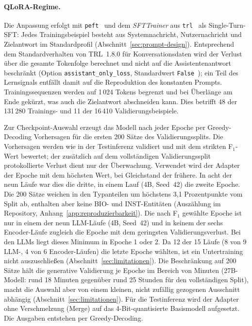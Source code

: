 \paragraph{QLoRA-Regime.}
Die Anpassung erfolgt mit \texttt{peft}~\cite{mangrulkar2022peft} und dem
\emph{SFTTrainer} aus \texttt{trl}~\cite{vonwerra2026trldocs} als
Single-Turn-SFT: Jedes Trainingsbeispiel besteht aus Systemnachricht,
Nutzernachricht und Zielantwort im Standardprofil
(Abschnitt~\ref{sec:prompt-design}).
Entsprechend dem Standardverhalten von TRL~1.8.0 für Konversationsdaten
wird der Verlust über die gesamte Tokenfolge berechnet und nicht auf die
Assistentenantwort beschränkt (Option \texttt{assistant\_only\_loss},
Standardwert \texttt{False}~\cite{vonwerra2026trldocs}); ein Teil des
Lernsignals entfällt damit auf die Reproduktion des konstanten Prompts.
Trainingssequenzen werden auf 1\,024 Tokens begrenzt und bei Überlänge
am Ende gekürzt, was auch die Zielantwort abschneiden kann. Dies betrifft
48 der 131\,280 Trainings- und 11 der 16\,410 Validierungsbeispiele.

Zur Checkpoint-Auswahl erzeugt das Modell nach jeder Epoche per Greedy-Decoding
Vorhersagen für die ersten 200 Sätze des Validierungssplits.
Die Vorhersagen werden wie in der Testinferenz validiert und mit dem
strikten F$_1$-Wert bewertet; der zusätzlich auf dem vollständigen Validierungssplit protokollierte
Verlust dient nur der Überwachung.
Verwendet wird der Adapter der Epoche mit dem höchsten Wert, bei
Gleichstand der frühere. In acht der neun Läufe war dies die dritte, in
einem Lauf (4B, Seed~42) die zweite Epoche.
Die 200 Sätze weichen in den Typanteilen um höchstens 3,1 Prozentpunkte
vom Split ab, enthalten aber keine BIO- und INST-Entitäten
(Auszählung im Repository, Anhang~\ref{app:reproduzierbarkeit}).
Die nach F$_1$ gewählte Epoche ist nur in einem der neun LLM-Läufe
(4B, Seed~42) und in keinem der sechs Encoder-Läufe zugleich die Epoche
mit dem geringsten Validierungsverlust.
Bei den LLMs liegt dieses Minimum in Epoche 1 oder 2.
Da 12 der 15 Läufe (8 von 9 LLM-, 4 von 6 Encoder-Läufen) die letzte
Epoche wählten, ist ein Untertraining nicht auszuschließen
(Abschnitt~\ref{sec:limitationen}).
Die Beschränkung auf 200 Sätze hält die generative Validierung je Epoche
im Bereich von Minuten (27B-Modell: rund 18 Minuten gegenüber rund
25 Stunden für den vollständigen Split), macht die Auswahl aber von einem
kleinen, nicht zufällig gezogenen Ausschnitt abhängig
(Abschnitt~\ref{sec:limitationen}).
Für die Testinferenz wird der Adapter ohne Verschmelzung (Merge) auf das
4-Bit-quantisierte Basismodell aufgesetzt. Die Ausgaben entstehen per
Greedy-Decoding.

